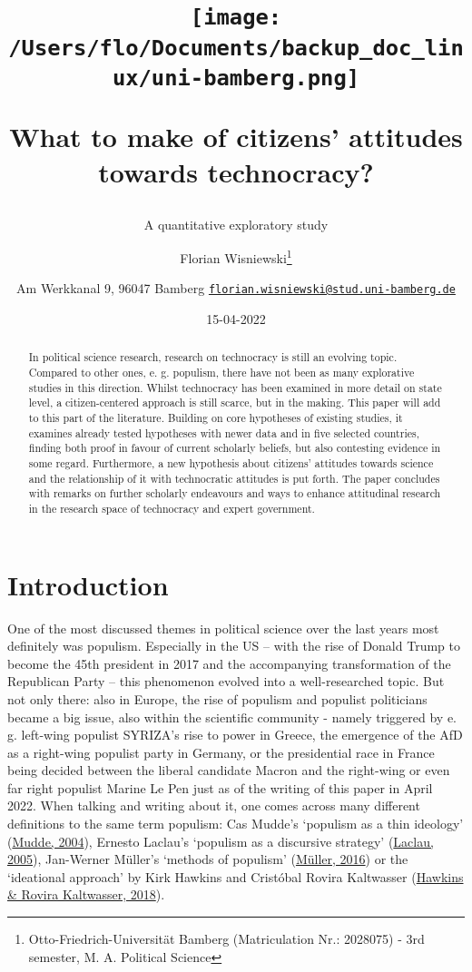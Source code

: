 \documentclass[
  12pt,
  english,
]{article}
\title{\texttt{[image: /Users/flo/Documents/backup\_doc\_linux/uni-bamberg.png]}

What to make of citizens' attitudes towards technocracy?}
\subtitle{A quantitative exploratory study}
\author{Florian Wisniewski\footnote{Otto-Friedrich-Universität Bamberg
  (Matriculation Nr.: 2028075) - 3rd semester, M. A. Political Science} \and Am
Werkkanal 9, 96047 Bamberg \textbar{}
\href{mailto:florian.wisniewski@stud.uni-bamberg.de}{\nolinkurl{florian.wisniewski@stud.uni-bamberg.de}}}
\date{15-04-2022}
\begin{document}
\maketitle
\begin{abstract}
In political science research, research on technocracy is still an
evolving topic. Compared to other ones, e. g. populism, there have not
been as many explorative studies in this direction. Whilst technocracy
has been examined in more detail on state level, a citizen-centered
approach is still scarce, but in the making. This paper will add to this
part of the literature. Building on core hypotheses of existing studies,
it examines already tested hypotheses with newer data and in five
selected countries, finding both proof in favour of current scholarly
beliefs, but also contesting evidence in some regard. Furthermore, a new
hypothesis about citizens' attitudes towards science and the
relationship of it with technocratic attitudes is put forth. The paper
concludes with remarks on further scholarly endeavours and ways to
enhance attitudinal research in the research space of technocracy and
expert government.
\end{abstract}

\newpage{}

\tableofcontents

\newpage{}

\hypertarget{introduction}{%
\section{Introduction}\label{introduction}}

One of the most discussed themes in political science over the last
years most definitely was populism. Especially in the US -- with the
rise of Donald Trump to become the 45th president in 2017 and the
accompanying transformation of the Republican Party -- this phenomenon
evolved into a well-researched topic. But not only there: also in
Europe, the rise of populism and populist politicians became a big
issue, also within the scientific community - namely triggered by e. g.
left-wing populist SYRIZA's rise to power in Greece, the emergence of
the AfD as a right-wing populist party in Germany, or the presidential
race in France being decided between the liberal candidate Macron and
the right-wing or even far right populist Marine Le Pen just as of the
writing of this paper in April 2022. When talking and writing about it,
one comes across many different definitions to the same term populism:
Cas Mudde's `populism as a thin ideology'
(\protect\hyperlink{ref-mudde2004populist}{Mudde, 2004}), Ernesto
Laclau's `populism as a discursive strategy'
(\protect\hyperlink{ref-laclau2005populist}{Laclau, 2005}), Jan-Werner
Müller's `methods of populism'
(\protect\hyperlink{ref-muxfcller2016populismus}{Müller, 2016}) or the
`ideational approach' by Kirk Hawkins and Cristóbal Rovira Kaltwasser
(\protect\hyperlink{ref-hawkins2018ideational}{Hawkins \& Rovira
Kaltwasser, 2018}).
\end{document}
